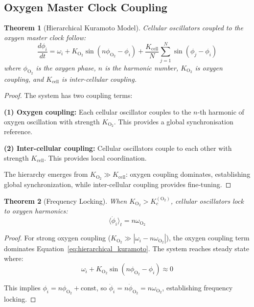 \documentclass[11pt,twocolumn,a4paper]{article}
\newtheorem{theorem}{Theorem}[section]
\theoremstyle{definition}
\theoremstyle{remark}
\begin{document}
\subsection{Oxygen Master Clock Coupling}

\begin{theorem}[Hierarchical Kuramoto Model]
\label{thm:hierarchical_kuramoto}
Cellular oscillators coupled to the oxygen master clock follow:
\begin{equation}
\frac{d\phi_i}{dt} = \omega_i + K_{\mathrm{O_2}} \sin(n\phi_{\mathrm{O_2}} - \phi_i) + \frac{K_{\mathrm{cell}}}{N} \sum_{j=1}^N \sin(\phi_j - \phi_i)
\label{eq:hierarchical_kuramoto}
\end{equation}
where $\phi_{\mathrm{O_2}}$ is the oxygen phase, $n$ is the harmonic number, $K_{\mathrm{O_2}}$ is oxygen coupling, and $K_{\mathrm{cell}}$ is inter-cellular coupling.
\end{theorem}

\begin{proof}
The system has two coupling terms:

\textbf{(1) Oxygen coupling:} Each cellular oscillator couples to the $n$-th harmonic of oxygen oscillation with strength $K_{\mathrm{O_2}}$. This provides a global synchronisation reference.

\textbf{(2) Inter-cellular coupling:} Cellular oscillators couple to each other with strength $K_{\mathrm{cell}}$. This provides local coordination.

The hierarchy emerges from $K_{\mathrm{O_2}} \gg K_{\mathrm{cell}}$: oxygen coupling dominates, establishing global synchronization, while inter-cellular coupling provides fine-tuning.
\end{proof}

\begin{theorem}[Frequency Locking]
\label{thm:frequency_locking}
When $K_{\mathrm{O_2}} > K_c^{\mathrm{(O_2)}}$, cellular oscillators lock to oxygen harmonics:
\begin{equation}
\langle \dot{\phi}_i \rangle_t = n \omega_{\mathrm{O_2}}
\label{eq:frequency_locking}
\end{equation}
\end{theorem}

\begin{proof}
For strong oxygen coupling ($K_{\mathrm{O_2}} \gg |\omega_i - n\omega_{\mathrm{O_2}}|$), the oxygen coupling term dominates Equation~\eqref{eq:hierarchical_kuramoto}. The system reaches steady state where:
\begin{equation}
\omega_i + K_{\mathrm{O_2}} \sin(n\phi_{\mathrm{O_2}} - \phi_i) \approx 0
\end{equation}

This implies $\phi_i = n\phi_{\mathrm{O_2}} + \text{const}$, so $\dot{\phi}_i = n\dot{\phi}_{\mathrm{O_2}} = n\omega_{\mathrm{O_2}}$, establishing frequency locking.
\end{proof}
\end{document}
